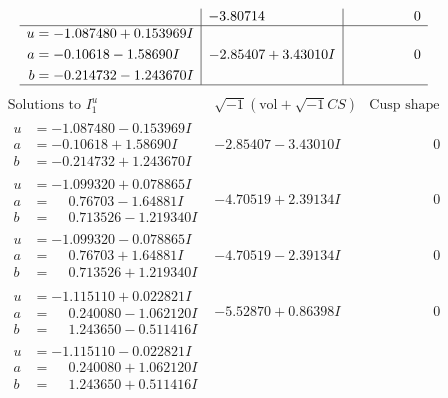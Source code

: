 \documentclass[1p]{elsarticle_modified}
\theoremstyle{definition}
\newcommand{\I}{\sqrt{-1}}
\begin{document}
$$\begin{array}{c|c|c}
 & -3.80714\phantom{ +0.000000I} & \phantom{-0.000000 } 0 \\ \hline\begin{aligned}
u &= -1.087480 + 0.153969 I \\
a &= -0.10618 - 1.58690 I \\
b &= -0.214732 - 1.243670 I\end{aligned}
 & -2.85407 + 3.43010 I & \phantom{-0.000000 } 0\\
 \hline 
 \end{array}$$\newpage$$\begin{array}{c|c|c}  
\text{Solutions to }I^u_{1}& \I (\text{vol} + \sqrt{-1}CS) & \text{Cusp shape}\\
 \hline 
\begin{aligned}
u &= -1.087480 - 0.153969 I \\
a &= -0.10618 + 1.58690 I \\
b &= -0.214732 + 1.243670 I\end{aligned}
 & -2.85407 - 3.43010 I & \phantom{-0.000000 } 0 \\ \hline\begin{aligned}
u &= -1.099320 + 0.078865 I \\
a &= \phantom{-}0.76703 - 1.64881 I \\
b &= \phantom{-}0.713526 - 1.219340 I\end{aligned}
 & -4.70519 + 2.39134 I & \phantom{-0.000000 } 0 \\ \hline\begin{aligned}
u &= -1.099320 - 0.078865 I \\
a &= \phantom{-}0.76703 + 1.64881 I \\
b &= \phantom{-}0.713526 + 1.219340 I\end{aligned}
 & -4.70519 - 2.39134 I & \phantom{-0.000000 } 0 \\ \hline\begin{aligned}
u &= -1.115110 + 0.022821 I \\
a &= \phantom{-}0.240080 - 1.062120 I \\
b &= \phantom{-}1.243650 - 0.511416 I\end{aligned}
 & -5.52870 + 0.86398 I & \phantom{-0.000000 } 0 \\ \hline\begin{aligned}
u &= -1.115110 - 0.022821 I \\
a &= \phantom{-}0.240080 + 1.062120 I \\
b &= \phantom{-}1.243650 + 0.511416 I\end{aligned}

\end{array}$$
\end{document}
